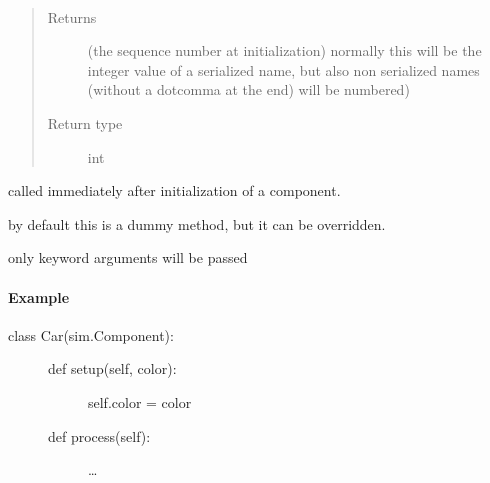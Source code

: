 \documentclass[letterpaper,10pt,english]{sphinxmanual}
\begin{document}
\begin{fulllineitems}
\begin{fulllineitems}
\begin{quote}
\begin{description}
\end{description}\end{quote}

\end{fulllineitems}


\begin{fulllineitems}
\label{\detokenize{Reference:salabim.Component.sequence_number}}~\begin{quote}\begin{description}
\item[{Returns}] \leavevmode
{} \textendash{} (the sequence number at initialization) 
normally this will be the integer value of a serialized name,
but also non serialized names (without a dotcomma at the end)
will be numbered)

\item[{Return type}] \leavevmode
int

\end{description}\end{quote}

\end{fulllineitems}


\begin{fulllineitems}
\label{\detokenize{Reference:salabim.Component.setup}}
called immediately after initialization of a component.

by default this is a dummy method, but it can be overridden.

only keyword arguments will be passed
\paragraph{Example}
\begin{description}
\item[{class Car(sim.Component):}] \leavevmode\begin{description}
\item[{def setup(self, color):}] \leavevmode
self.color = color

\item[{def process(self):}] \leavevmode
…

\end{description}


\end{description}
\end{fulllineitems}
\end{fulllineitems}
\end{document}
